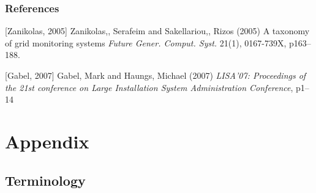 \documentclass{beamer}
\renewcommand\appendixname{Appendix}
\begin{document}



\begin{frame}
\frametitle{References}
\footnotesize{
\begin{thebibliography}{99} %

[Zanikolas, 2005] {Zanikolas,, Serafeim and Sakellariou,, Rizos} (2005)
\newblock A taxonomy of grid monitoring systems
\newblock \emph{Future Gener. Comput. Syst.} 21(1), 0167-739X, p163--188.

[Gabel, 2007] {Gabel, Mark and Haungs, Michael} (2007)
\newblock \emph{LISA'07: Proceedings of the 21st conference on Large Installation System Administration Conference}, p1--14

\end{thebibliography}
}
\end{frame}


\appendix

\section{\appendixname}
\frame{\tableofcontents}

\subsection{Terminology}
\end{document}
